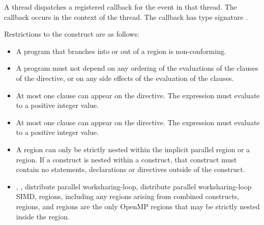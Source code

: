 A thread dispatches a registered 
callback for the  event in that thread. The callback 
occurs in the context of the thread.  The callback has type signature
.

\restrictions
Restrictions to the  construct are as follows:

\begin{itemize}
\item A program that branches into or out of a  region is non-conforming.
\item A program must not depend on any ordering of the evaluations of the clauses 
      of the  directive, or on any side effects of the evaluation of 
      the clauses.
\item At most one  clause can appear on the directive. The
       expression must evaluate to a positive integer value.
\item At most one  clause can appear on the directive. The 
       expression must evaluate to a positive integer value.
\item A  region can only be strictly nested within the implicit 
      parallel region or a  region. If a  construct 
      is nested within a  construct, that  construct 
      must contain no statements, declarations or directives outside of the 
       construct. \item {}, , 
      distribute parallel worksharing-loop, distribute parallel worksharing-loop 
      SIMD,  regions, including any  regions arising 
      from combined constructs,  regions, and 
       regions are the only OpenMP regions that may be 
      strictly nested inside the  region.
\end{itemize}

